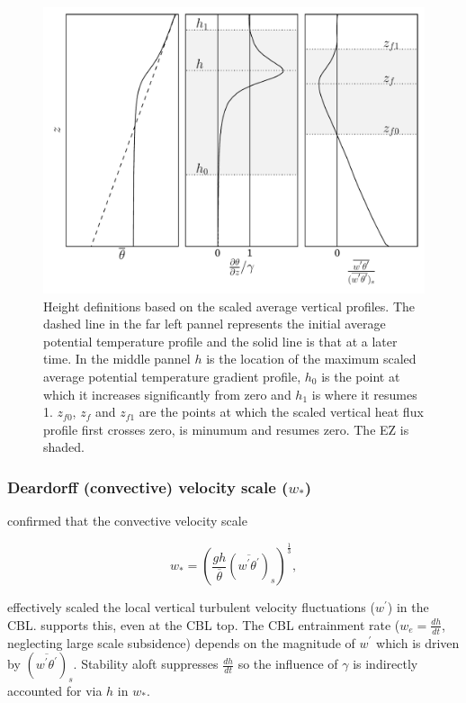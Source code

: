 \begin{figure}[htbp]
    \centering
    
    \includegraphics[scale=.5]{figures/height_defs.pdf}
    \caption[Height Definitions]{Height definitions based on the scaled average vertical profiles. The dashed line in the far left pannel represents the initial average potential temperature profile and the solid line is that at a later time. In the middle pannel $h$ is the location of the maximum scaled average potential temperature gradient profile, $h_{0}$ is the point at which it increases significantly from zero and $h_{1}$ is where it resumes 1.  $z_{f0}$, $z_{f}$ and $z_{f1}$ are the points at which the scaled vertical heat flux profile first crosses zero, is minumum and resumes zero. The EZ is shaded.}
    \label{fig:hdefs} 
\end{figure}
 

\subsubsection{Deardorff (convective) velocity scale ($w_{*}$)}
\label{subsubsec:convel}

\cite{Deardorff70} confirmed that the convective velocity scale

\begin{equation}
w_{*} = \left( \frac{gh}{\overline{\theta}}(\overline{w^{'}\theta^{'}})_{s} \right)^{\frac{1}{3}},
\end{equation}


 effectively scaled the local vertical turbulent velocity fluctuations ($w^{'}$) in the CBL.  \cite{Sorbjan1} supports this, even at the CBL top.  The CBL entrainment rate ($w_{e} = \frac{dh}{dt}$, neglecting large scale subsidence) depends on the magnitude of $w^{'}$ which is driven by $(\overline{w^{'}\theta^{'}})_{s}$. Stability aloft suppresses $\frac{dh}{dt}$ so the influence of $\gamma$ is indirectly accounted for via $h$ in $w_{*}$.\\

